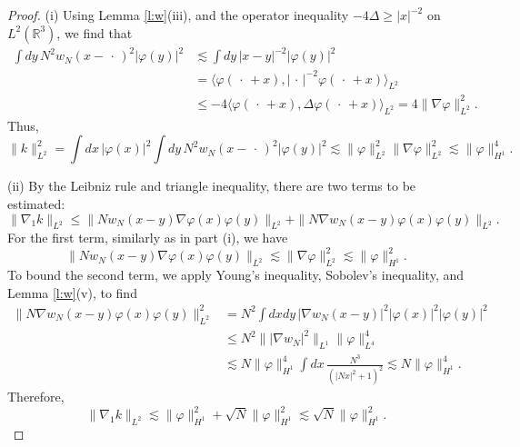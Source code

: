 \documentclass[11pt,a4paper]{scrartcl} %
\newcommand{\R}{\mathds{R}}
\begin{document}
\begin{proof}
  (i) Using Lemma \ref{l:w}(iii), and the operator inequality $-4 \Delta \ge
  |x|^{-2}$ on $L^2(\R^3)$, we find that
  \begin{equation}
    \begin{aligned}
      \int dy \, N^2 w_N(x-\,\cdot\,)^2 |\varphi(y)|^2 & \apprle \int dy \,
      |x-y|^{-2} |\varphi(y)|^2 \\
      & = \langle \varphi(\,\cdot\,+x), |\,\cdot\,|^{-2} \varphi(\,\cdot\,+x)
      \rangle_{L^2} \\
      & \le -4 \langle \varphi(\,\cdot\,+x), \Delta \varphi(\,\cdot\,+x)
      \rangle_{L^2} = 4 \| \nabla \varphi \|_{L^2}^2.
    \end{aligned}
    \label{w}
  \end{equation}
  Thus,
  \[
    \| k \|_{L^2}^2 = \int dx \, |\varphi(x)|^2 \int dy \, N^2
    w_N(x-\,\cdot\,)^2 |\varphi(y)|^2 \apprle \| \varphi \|_{L^2}^2 \| \nabla
    \varphi \|_{L^2}^2 \apprle \| \varphi \|_{H^1}^4.
  \]


  (ii) By the Leibniz rule and triangle inequality, there are two terms to be
  estimated:
  \[
    \| \nabla_1 k \|_{L^2} \le \| N w_N(x-y) \nabla \varphi(x) \varphi(y)
    \|_{L^2} + \| N \nabla w_N(x-y) \varphi(x) \varphi(y) \|_{L^2}.
  \]
  For the first term, similarly as in part (i), we have
  \[
    \| N w_N(x-y) \nabla \varphi(x) \varphi(y) \|_{L^2} \apprle \| \nabla
    \varphi \|_{L^2}^2 \apprle \| \varphi \|_{H^1}^2.
  \]
  To bound the second term, we apply Young's inequality, Sobolev's inequality,
  and Lemma \ref{l:w}(v), to find
  \begin{align*}
    \| N \nabla w_N(x-y) \varphi(x) \varphi(y) \|_{L^2}^2 & = N^2 \int dx dy
    \, |\nabla w_N(x-y)|^2 |\varphi(x)|^2 |\varphi(y)|^2 \\
    & \le N^2 \| | \nabla w_N|^2 \|_{L^1} \| \varphi \|_{L^4}^4 \\
    & \apprle N \| \varphi \|_{H^1}^4 \int dx \, \frac{N^3}{(|Nx|^2 + 1)^2}
    \apprle N \| \varphi \|_{H^1}^4.
  \end{align*}
  Therefore,
  \[
    \| \nabla_1 k \|_{L^2} \apprle \| \varphi \|_{H^1}^2 + \sqrt{N} \| \varphi
    \|_{H^1}^2 \apprle \sqrt{N} \| \varphi \|_{H^1}^2.
  \]



\end{proof}
\end{document}
